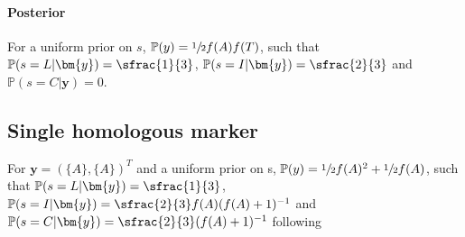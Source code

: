 \paragraph{Posterior} For a uniform prior on $s$, $\mathbb{P}(y) = \sfrac{1}{2}f(A)f(T)$, such that $\mathbb{P}(s = L|\bm{y}) = \sfrac{1}{3}$, $\mathbb{P}(s = I|\bm{y}) = \sfrac{2}{3}$ and $\mathbb{P}(s = C|\bm{y}) = 0$. \\

\subsection{Single homologous marker} \label{ex:simplest_hom}
For $\bm{y} = (\{A\}, \{A\})^{T}$ and a uniform prior on s, $\mathbb{P}(y) = \sfrac{1}{2}f(A)^2 + \sfrac{1}{2}f(A)$, such that $\mathbb{P}(s = L|\bm{y}) = \sfrac{1}{3}$, $\mathbb{P}(s = I|\bm{y}) = \sfrac{2}{3}f(A)(f(A)+1)^{-1}$ and $\mathbb{P}(s = C|\bm{y}) = \sfrac{2}{3}(f(A)+1)^{-1}$ following
\small
